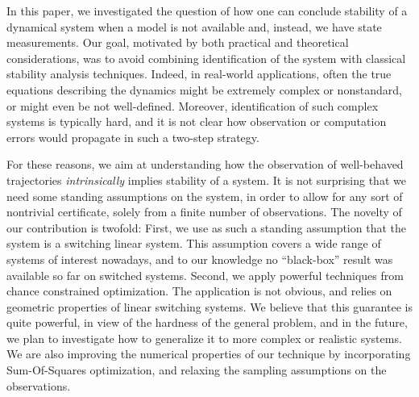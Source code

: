 In this paper, we investigated the question of how one can conclude stability of a dynamical system when a model is not available and, instead, we have state measurements. Our goal, motivated by both practical and theoretical considerations, was to avoid combining identification of the system with classical stability analysis techniques. Indeed, in real-world applications, often the true equations describing the dynamics might be extremely complex or nonstandard, or might even be not well-defined. Moreover, identification of such complex systems is typically hard, and it is not clear how observation or computation errors would propagate in such a two-step strategy. 

For these reasons, we aim at understanding how the observation of well-behaved trajectories \emph{intrinsically} implies stability of a system. It is not surprising that we need some standing assumptions on the system, in order to allow for any sort of nontrivial certificate, solely from a finite number of observations. The novelty of our contribution is twofold: 
First, we use as such a standing assumption that the system is a switching linear system. This assumption covers a wide range of systems of interest nowadays, and to our knowledge no ``black-box'' result was available so far on switched systems.  
Second, we apply powerful techniques from chance constrained optimization. The application is not obvious, and relies on geometric properties of linear switching systems. We believe that this guarantee is quite powerful, in view of the hardness of the general problem, and in the future, we plan to investigate how to generalize it to more complex or realistic systems. We are also improving the numerical properties of our technique by incorporating Sum-Of-Squares optimization, and relaxing the sampling assumptions on the observations.

